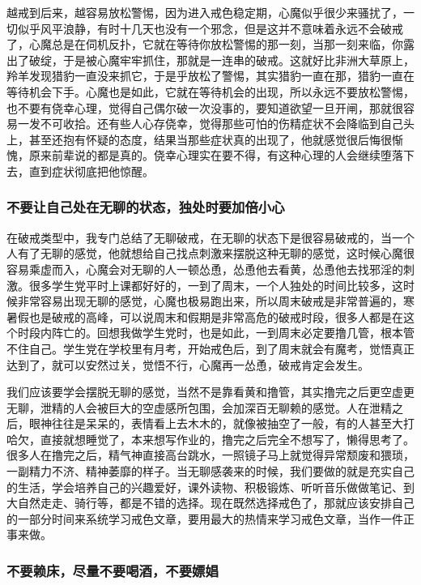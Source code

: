 越戒到后来，越容易放松警惕，因为进入戒色稳定期，心魔似乎很少来骚扰了，一切似乎风平浪静，有时十几天也没有一个邪念，但是这并不意味着永远不会破戒了，心魔总是在伺机反扑，它就在等待你放松警惕的那一刻，当那一刻来临，你露出了破绽，于是被心魔牢牢抓住，那就是一连串的破戒。这就好比非洲大草原上，羚羊发现猎豹一直没来抓它，于是乎放松了警惕，其实猎豹一直在那，猎豹一直在等待机会下手。心魔也是如此，它就在等待机会的出现，所以永远不要放松警惕，也不要有侥幸心理，觉得自己偶尔破一次没事的，要知道欲望一旦开闸，那就很容易一发不可收拾。还有些人心存侥幸，觉得那些可怕的伤精症状不会降临到自己头上，甚至还抱有怀疑的态度，结果当那些症状真的出现了，他就感觉很后悔很惭愧，原来前辈说的都是真的。侥幸心理实在要不得，有这种心理的人会继续堕落下去，直到症状彻底把他惊醒。

\subsubsection{不要让自己处在无聊的状态，独处时要加倍小心}

在破戒类型中，我专门总结了无聊破戒，在无聊的状态下是很容易破戒的，当一个人有了无聊的感觉，他就想给自己找点刺激来摆脱这种无聊的感觉，这时候心魔很容易乘虚而入，心魔会对无聊的人一顿怂恿，怂恿他去看黄，怂恿他去找邪淫的刺激。很多学生党平时上课都好好的，一到了周末，一个人独处的时间比较多，这时候非常容易出现无聊的感觉，心魔也极易跑出来，所以周末破戒是非常普遍的，寒暑假也是破戒的高峰，可以说周末和假期是非常高危的破戒时段，很多人都是在这个时段内阵亡的。回想我做学生党时，也是如此，一到周末必定要撸几管，根本管不住自己。学生党在学校里有月考，开始戒色后，到了周末就会有魔考，觉悟真正达到了，就可以安然过关，觉悟不行，心魔再一怂恿，破戒肯定会发生。

我们应该要学会摆脱无聊的感觉，当然不是靠看黄和撸管，其实撸完之后更空虚更无聊，泄精的人会被巨大的空虚感所包围，会加深百无聊赖的感觉。人在泄精之后，眼神往往是呆呆的，表情看上去木木的，就像被抽空了一般，有的人甚至大打哈欠，直接就想睡觉了，本来想写作业的，撸完之后完全不想写了，懒得思考了。很多人在撸完之后，精气神直接高台跳水，一照镜子马上就觉得异常颓废和猥琐，一副精力不济、精神萎靡的样子。当无聊感袭来的时候，我们要做的就是充实自己的生活，学会培养自己的兴趣爱好，课外读物、积极锻炼、听听音乐做做笔记、到大自然走走、骑行等，都是不错的选择。现在既然选择戒色了，那就应该安排自己的一部分时间来系统学习戒色文章，要用最大的热情来学习戒色文章，当作一件正事来做。

\subsubsection{不要赖床，尽量不要喝酒，不要嫖娼}

